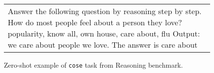 \begin{figure}
\centering
\begin{tabular}{p{}}
\cellcolor{oldlace} Answer the following question by reasoning step by step.\vspace{1pt} \newline \vspace{1pt} \newline How do most people feel about a person they love?\vspace{1pt} \newline popularity, know all, own house, care about, flu Output: \textcolor{cadmiumgreen}{we care about people we love. The answer is care about} \\
\end{tabular}
\caption{Zero-shot example of \texttt{cose} task from Reasoning benchmark.}
\end{figure}





















































































